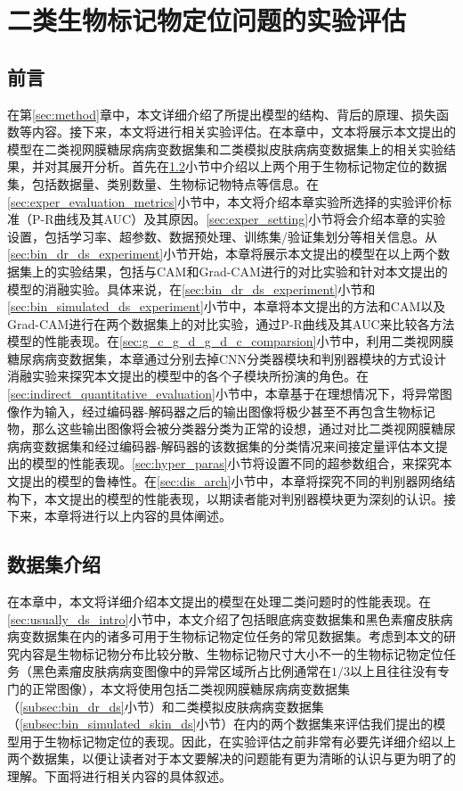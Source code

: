 \chapter{二类生物标记物定位问题的实验评估}\label{sec:experiments}
\section{前言}
在第\ref{sec:method}章中，本文详细介绍了所提出模型的结构、背后的原理、损失函数等内容。接下来，本文将进行相关实验评估。在本章中，文本将展示本文提出的模型在二类视网膜糖尿病病变数据集和二类模拟皮肤病病变数据集上的相关实验结果，并对其展开分析。首先在\ref{sec:exper_ds_intro}小节中介绍以上两个用于生物标记物定位的数据集，包括数据量、类别数量、生物标记物特点等信息。在\ref{sec:exper_evaluation_metrics}小节中，本文将介绍本章实验所选择的实验评价标准（P-R曲线及其AUC）及其原因。\ref{sec:exper_setting}小节将会介绍本章的实验设置，包括学习率、超参数、数据预处理、训练集/验证集划分等相关信息。从\ref{sec:bin_dr_ds_experiment}小节开始，本章将展示本文提出的模型在以上两个数据集上的实验结果，包括与CAM和Grad-CAM进行的对比实验和针对本文提出的模型的消融实验。具体来说，在\ref{sec:bin_dr_ds_experiment}小节和\ref{sec:bin_simulated_ds_experiment}小节中，本章将本文提出的方法和CAM以及Grad-CAM进行在两个数据集上的对比实验，通过P-R曲线及其AUC来比较各方法模型的性能表现。在\ref{sec:g_c_g_d_g_d_c_comparsion}小节中，利用二类视网膜糖尿病病变数据集，本章通过分别去掉CNN分类器模块和判别器模块的方式设计消融实验来探究本文提出的模型中的各个子模块所扮演的角色。在\ref{sec:indirect_quantitative_evaluation}小节中，本章基于在理想情况下，将异常图像作为输入，经过编码器-解码器之后的输出图像将极少甚至不再包含生物标记物，那么这些输出图像将会被分类器分类为正常的设想，通过对比二类视网膜糖尿病病变数据集和经过编码器-解码器的该数据集的分类情况来间接定量评估本文提出的模型的性能表现。\ref{sec:hyper_paras}小节将设置不同的超参数组合，来探究本文提出的模型的鲁棒性。在\ref{sec:dis_arch}小节中，本章将探究不同的判别器网络结构下，本文提出的模型的性能表现，以期读者能对判别器模块更为深刻的认识。接下来，本章将进行以上内容的具体阐述。
\section{数据集介绍}\label{sec:exper_ds_intro}
在本章中，本文将详细介绍本文提出的模型在处理二类问题时的性能表现。在\ref{sec:usually_ds_intro}小节中，本文介绍了包括眼底病变数据集和黑色素瘤皮肤病病变数据集在内的诸多可用于生物标记物定位任务的常见数据集。考虑到本文的研究内容是生物标记物分布比较分散、生物标记物尺寸大小不一的生物标记物定位任务（黑色素瘤皮肤病病变图像中的异常区域所占比例通常在$1/3$以上且往往没有专门的正常图像），本文将使用包括二类视网膜糖尿病病变数据集（\ref{subsec:bin_dr_ds}小节）和二类模拟皮肤病病变数据集（\ref{subsec:bin_simulated_skin_ds}小节）在内的两个数据集来评估我们提出的模型用于生物标记物定位的表现。因此，在实验评估之前非常有必要先详细介绍以上两个数据集，以便让读者对于本文要解决的问题能有更为清晰的认识与更为明了的理解。下面将进行相关内容的具体叙述。
